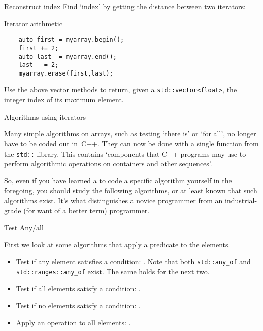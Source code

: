 \begin{block}{Reconstruct index}
  \label{sl:iterator-distance}
  Find `index' by getting the distance between
  two iterators:
\end{block}

\begin{slide}{Iterator arithmetic}
  \label{sl:iterator-arithmetic}
  \begin{lstlisting}
    auto first = myarray.begin();
    first += 2;
    auto last  = myarray.end();
    last  -= 2;
    myarray.erase(first,last);
  \end{lstlisting}
\end{slide}

\begin{exercise}
  Use the above vector methods to return,
  given a \lstinline+std::vector<float>+,
  the integer index of its maximum element.
\end{exercise}

 {Algorithms using iterators}
\label{sec:algorithm}

Many simple algorithms on arrays, such as testing `there is' or `for all',
no longer have to be coded out in~C++.
They can now be done with a single
function from the \lstinline{std::} library.
This contains `components that C++ programs may use to perform
algorithmic operations on containers and other sequences'.

So, even if you have learned a to code a specific algorithm yourself
in the foregoing,
you should study the following algorithms,
or at least known that such algorithms exist.
It's what distinguishes a novice programmer
from an industrial-grade (for want of a better term) programmer.

 {Test Any/all}
\label{sec:alg-iter}

First we look at some algorithms that apply a predicate
to the elements.
\begin{itemize}
\item Test if any element satisfies a condition:
  .
  Note that both \lstinline{std::any_of} and
  \lstinline{std::ranges::any_of} exist.
  The same holds for the next two.
\item Test if all elements satisfy a condition:
  .
\item Test if no elements satisfy a condition:
  .
\item Apply an operation to all elements: .
\end{itemize}

